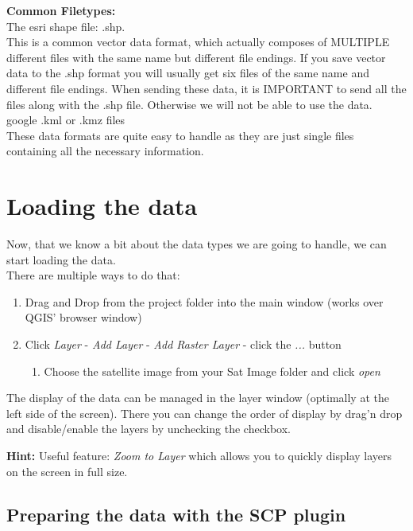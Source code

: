 \documentclass[12pt,a4paper]{scrartcl}
\begin{document}
\textbf{Common Filetypes:}\\

The esri shape file: .shp. \\
This is a common vector data format, which actually composes of MULTIPLE different files with the same name but different file endings.
If you save vector data to the .shp format you will usually get six files of the same name and different file endings.
When sending these data, it is IMPORTANT to send all the files along with the .shp file. 
Otherwise we will not be able to use the data.\\

google .kml or .kmz files \\
These data formats are quite easy to handle as they are just single files containing all the necessary information.

\section{Loading the data}
\label{step3}

Now, that we know a bit about the data types we are going to handle, we can start loading the data. \\
There are multiple ways to do that:  

\begin{enumerate}
\item Drag and Drop from the project folder into the main window (works over QGIS' browser window)

\item Click \textit{Layer} - \textit{Add Layer} - \textit{Add Raster Layer} - click the \textit{...} button
\begin{enumerate}
\item Choose the satellite image from your Sat Image folder and click \textit{open}
\end{enumerate}

\end{enumerate}

The display of the data can be managed in the layer window (optimally at the left side of the screen). 
There you can change the order of display by drag'n drop and disable/enable the layers by unchecking the checkbox. 

\textbf{Hint:} Useful feature: \textit{Zoom to Layer} which allows you to quickly display layers on the screen in full size.  

\subsection{Preparing the data with the SCP plugin}
\label{scpprep}
\end{document}
